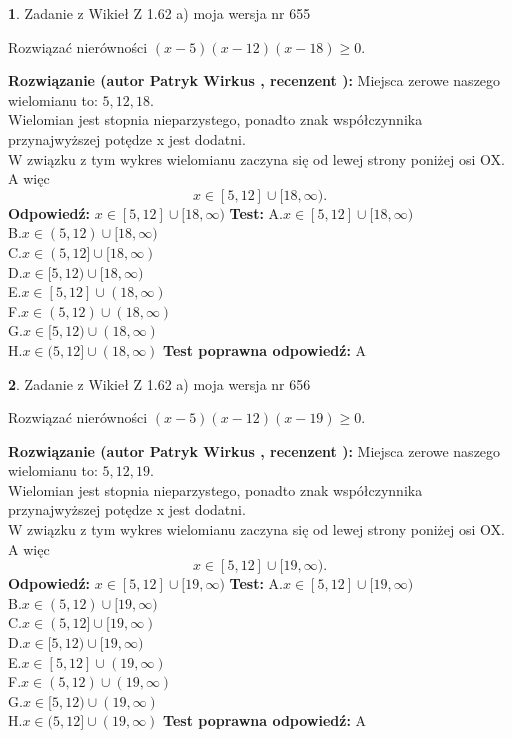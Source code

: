 \documentclass[12pt, a4paper]{article}
\theoremstyle{definition} %
\newtheorem{zad}{}
\newcommand{\zadStart}[1]{\begin{zad}#1\newline}
\newcommand{\zadStop}{\end{zad}}
\newcommand{\rozwStart}[2]{\noindent \textbf{Rozwiązanie (autor #1 , recenzent #2): }\newline}
\newcommand{\rozwStop}{\newline}
\newcommand{\odpStart}{\noindent \textbf{Odpowiedź:}\newline}
\newcommand{\odpStop}{\newline}
\newcommand{\testStart}{\noindent \textbf{Test:}\newline}
\newcommand{\testStop}{\newline}
\newcommand{\kluczStart}{\noindent \textbf{Test poprawna odpowiedź:}\newline}
\newcommand{\kluczStop}{\newline}
\begin{document}
\zadStart{Zadanie z Wikieł Z 1.62 a) moja wersja nr 655}

Rozwiązać nierówności $(x-5)(x-12)(x-18)\ge0$.
\zadStop
\rozwStart{Patryk Wirkus}{}
Miejsca zerowe naszego wielomianu to: $5, 12, 18$.\\
Wielomian jest stopnia nieparzystego, ponadto znak współczynnika przy\linebreak najwyższej potędze x jest dodatni.\\ W związku z tym wykres wielomianu zaczyna się od lewej strony poniżej osi OX. A więc $$x \in [5,12] \cup [18,\infty).$$
\rozwStop
\odpStart
$x \in [5,12] \cup [18,\infty)$
\odpStop
\testStart
A.$x \in [5,12] \cup [18,\infty)$\\
B.$x \in (5,12) \cup [18,\infty)$\\
C.$x \in (5,12] \cup [18,\infty)$\\
D.$x \in [5,12) \cup [18,\infty)$\\
E.$x \in [5,12] \cup (18,\infty)$\\
F.$x \in (5,12) \cup (18,\infty)$\\
G.$x \in [5,12) \cup (18,\infty)$\\
H.$x \in (5,12] \cup (18,\infty)$
\testStop
\kluczStart
A
\kluczStop



\zadStart{Zadanie z Wikieł Z 1.62 a) moja wersja nr 656}

Rozwiązać nierówności $(x-5)(x-12)(x-19)\ge0$.
\zadStop
\rozwStart{Patryk Wirkus}{}
Miejsca zerowe naszego wielomianu to: $5, 12, 19$.\\
Wielomian jest stopnia nieparzystego, ponadto znak współczynnika przy\linebreak najwyższej potędze x jest dodatni.\\ W związku z tym wykres wielomianu zaczyna się od lewej strony poniżej osi OX. A więc $$x \in [5,12] \cup [19,\infty).$$
\rozwStop
\odpStart
$x \in [5,12] \cup [19,\infty)$
\odpStop
\testStart
A.$x \in [5,12] \cup [19,\infty)$\\
B.$x \in (5,12) \cup [19,\infty)$\\
C.$x \in (5,12] \cup [19,\infty)$\\
D.$x \in [5,12) \cup [19,\infty)$\\
E.$x \in [5,12] \cup (19,\infty)$\\
F.$x \in (5,12) \cup (19,\infty)$\\
G.$x \in [5,12) \cup (19,\infty)$\\
H.$x \in (5,12] \cup (19,\infty)$
\testStop
\kluczStart
A
\kluczStop
\end{document}
